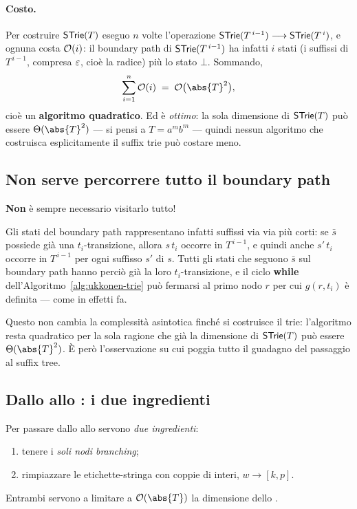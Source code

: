 \paragraph{Costo.}
Per costruire $\textsf{STrie}{}(T)$ eseguo $n$ volte l'operazione
$\textsf{STrie}{}(T^{\,i-1}) \longrightarrow \textsf{STrie}{}(T^{\,i})$, e ognuna costa $\mathcal{O}(i)$: il boundary
path di $\textsf{STrie}{}(T^{\,i-1})$ ha infatti $i$ stati (i suffissi di $T^{\,i-1}$, compresa
$\varepsilon$, cioè la radice) più lo stato $\bot$. Sommando,
\[
  \sum_{i=1}^{n} \Oh(i) \;=\; \Oh\bigl(\abs{T}^{2}\bigr),
\]
cioè un \textbf{algoritmo quadratico}. Ed è \emph{ottimo}: la sola dimensione di
$\textsf{STrie}{}(T)$ può essere $\Th(\abs{T}^{2})$ --- si pensi a $T = a^m b^m$ --- quindi nessun
algoritmo che costruisca esplicitamente il suffix trie può costare meno.

\subsection[Il boundary path si può accorciare]{Non serve percorrere tutto il boundary path}

\begin{osservazione}
\textbf{Non} è sempre necessario visitarlo tutto!
\end{osservazione}

Gli stati del boundary path rappresentano infatti suffissi via via più corti: se $\bar s$
possiede già una $t_i$-transizione, allora $s\,t_i$ occorre in $T^{\,i-1}$, e quindi anche
$s'\,t_i$ occorre in $T^{\,i-1}$ per ogni suffisso $s'$ di $s$. Tutti gli stati che seguono
$\bar s$ sul boundary path hanno perciò già la loro $t_i$-transizione, e il ciclo
\textbf{while} dell'Algoritmo~\ref{alg:ukkonen-trie} può fermarsi al primo nodo $r$ per cui
$g(r,t_i)$ è definita --- come in effetti fa.

Questo non cambia la complessità asintotica finché si costruisce il trie: l'algoritmo resta
quadratico per la sola ragione che già la dimensione di $\textsf{STrie}{}(T)$ può essere
$\Th(\abs{T}^{2})$. È però l'osservazione su cui poggia tutto il guadagno del passaggio al
suffix tree.

\subsection[Dallo STrie allo STree: i due ingredienti]%
{Dallo \texorpdfstring{\STrie{}}{STrie} allo \texorpdfstring{\STree{}}{STree}: i due ingredienti}

Per passare dallo \STrie{} allo \STree{} servono \emph{due ingredienti}:
\begin{enumerate}
  \item[(i)] tenere i \emph{soli nodi branching};
  \item[(ii)] rimpiazzare le etichette-stringa con coppie di interi,
        $w \longrightarrow [k,p]$.
\end{enumerate}
Entrambi servono a limitare a $\Oh(\abs{T})$ la dimensione dello \STree{}.

